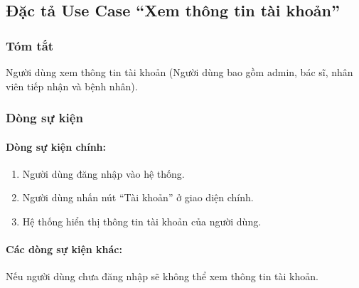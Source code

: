 \subsection{Đặc tả Use Case ``Xem thông tin tài khoản''}

\subsubsection{Tóm tắt}
Người dùng xem thông tin tài khoản (Người dùng bao gồm admin, bác sĩ, nhân viên tiếp nhận và bệnh nhân).

\subsubsection{Dòng sự kiện}
\paragraph{\textbf{Dòng sự kiện chính:}}
\begin{enumerate}
  \item Người dùng đăng nhập vào hệ thống.
  \item Người dùng nhấn nút ``Tài khoản'' ở giao diện chính.
  \item Hệ thống hiển thị thông tin tài khoản của người dùng.
\end{enumerate}

\paragraph{\textbf{Các dòng sự kiện khác:}}
Nếu người dùng chưa đăng nhập sẽ không thể xem thông tin tài khoản.

